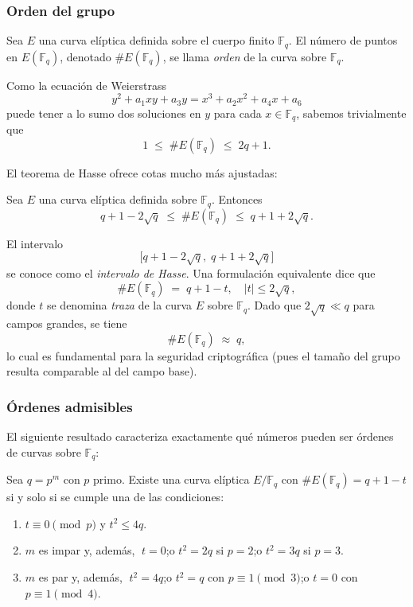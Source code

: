 \subsubsection*{Orden del grupo}
Sea \(E\) una curva elíptica definida sobre el cuerpo finito \(\mathbb{F}_q\).  
El número de puntos en \(E(\mathbb{F}_q)\), denotado \(\#E(\mathbb{F}_q)\), se llama \emph{orden} de la curva sobre \(\mathbb{F}_q\).  

Como la ecuación de Weierstrass
\[
y^2 + a_1 x y + a_3 y = x^3 + a_2 x^2 + a_4 x + a_6
\]
puede tener a lo sumo dos soluciones en \(y\) para cada \(x\in\mathbb{F}_q\), sabemos trivialmente que
\[
1 \;\le\;\#E(\mathbb{F}_q)\;\le\;2q+1.
\]

El teorema de Hasse ofrece cotas mucho más ajustadas:

\begin{teorema}[Hasse]
Sea \(E\) una curva elíptica definida sobre \(\mathbb{F}_q\). Entonces
\[
  q + 1 - 2\sqrt{q}\;\le\;\#E(\mathbb{F}_q)\;\le\;q + 1 + 2\sqrt{q}.
\]
\end{teorema}

El intervalo
\[
  \bigl[q+1-2\sqrt{q},\;q+1+2\sqrt{q}\bigr]
\]
se conoce como el \emph{intervalo de Hasse}. Una formulación equivalente dice que
\[
  \#E(\mathbb{F}_q) \;=\; q + 1 - t,
  \quad
  |t|\le2\sqrt{q},
\]
donde \(t\) se denomina \emph{traza} de la curva \(E\) sobre \(\mathbb{F}_q\). Dado que \(2\sqrt q\ll q\) para campos grandes, se tiene
\[
  \#E(\mathbb{F}_q)\;\approx\;q,
\]
lo cual es fundamental para la seguridad criptográfica (pues el tamaño del grupo resulta comparable al del campo base).

\subsubsection*{Órdenes admisibles}

El siguiente resultado caracteriza exactamente qué números pueden ser órdenes de curvas sobre \(\mathbb{F}_q\):

\begin{teorema}
Sea \(q=p^m\) con \(p\) primo. Existe una curva elíptica \(E/\mathbb{F}_q\) con
\(\#E(\mathbb{F}_q)=q+1-t\) si y solo si se cumple una de las condiciones:
\begin{enumerate}
  \item \(t\equiv0\pmod p\) y \(t^2\le4q\).
  \item \(m\) es impar y, además,  
    \(\;t=0\);\quad o \quad \(t^2=2q\) si \(p=2\);\quad o \quad \(t^2=3q\) si \(p=3\).
  \item \(m\) es par y, además,  
    \(\;t^2=4q\);\quad o \quad \(t^2=q\) con \(p\equiv1\pmod3\);\quad o \quad \(t=0\) con \(p\equiv1\pmod4\).
\end{enumerate}
\end{teorema}

